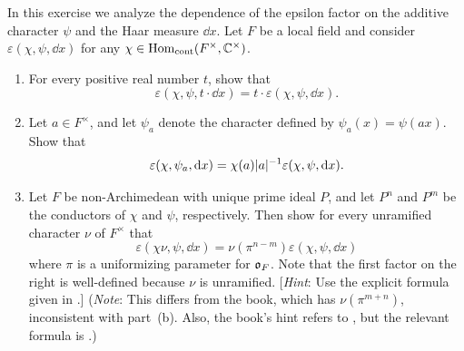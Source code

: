 \begin{exercise}[8]
  \label{ex:ch7-8}
  In this exercise we analyze the dependence of the epsilon factor on the
  additive character $\psi$ and the Haar measure $\dd x$. Let $F$ be a local
  field and consider $\varepsilon(\chi, \psi, \dd x)$ for any
  $\chi \in \operatorname{Hom}_{\mathrm{cont}}(F^\times, \mathbb{C}^\times)$.
  \begin{enumerate}[label=(\alph*)]
    \item For every positive real number $t$, show that
      \[
        \varepsilon(\chi, \psi, t \cdot \dd x)
        = t \cdot \varepsilon(\chi, \psi, \dd x).
      \]
    \item Let $a \in F^\times$, and let $\psi_a$ denote the character defined
      by $\psi_a(x) = \psi(ax)$. Show that
      \[
        \varepsilon(\chi, \psi_a, \mathop{}\!\mathrm{d} x)
        = \chi(a)\lvert a\rvert^{-1} \varepsilon(\chi, \psi, \mathop{}\!\mathrm{d} x).
      \]
    \item Let $F$ be non-Archimedean with unique prime ideal $P$, and let
      $P^n$ and $P^m$ be the conductors of $\chi$ and $\psi$, respectively.
      Then show for every unramified character $\nu$ of $F^\times$ that
      \[
        \varepsilon(\chi\nu, \psi, \dd x)
        = \nu(\pi^{n-m}) \varepsilon(\chi, \psi, \dd x)
      \]
      where $\pi$ is a uniformizing parameter for $\mathfrak{o}_F$. Note that the
      first factor on the right is well-defined because $\nu$ is unramified.
      [\emph{Hint}: Use the explicit formula given in .]
      (\emph{Note}: This differs from the book, which has $\nu(\pi^{m+n})$,
      inconsistent with part~(b). Also, the book's hint refers to
      , but the relevant formula is .)
  \end{enumerate}
\end{exercise}

